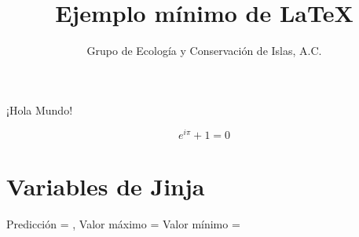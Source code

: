 \documentclass{article}
\begin{document}
\title{Ejemplo mínimo de \LaTeX}
\author{Grupo de Ecología y Conservación de Islas, A.C.}
\maketitle

¡Hola Mundo!

$$ e^{i\pi} + 1 = 0 $$

\section*{Variables de Jinja}
Predicción = ,
Valor máximo = 
Valor mínimo = 
\end{document}
